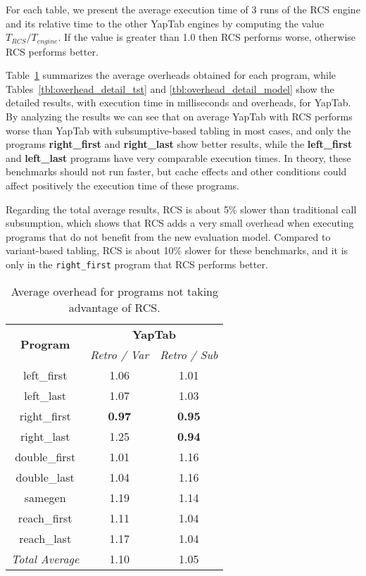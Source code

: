 For each table, we present the average execution time of 3 runs of the RCS engine and its relative time
to the other YapTab engines by computing the value $T_{RCS} / T_{engine}$.
If the value is greater than 1.0 then RCS performs worse, otherwise RCS performs better.

Table~\ref{tbl:overhead_overview} summarizes the average overheads obtained for each program,
while Tables~\ref{tbl:overhead_detail_tst} and \ref{tbl:overhead_detail_model} show the detailed
results, with execution time in milliseconds and overheads, for YapTab.
By analyzing the results we can see that on average YapTab with RCS performs worse
than YapTab with subsumptive-based tabling in most cases, and only the
programs \textbf{right\_first} and \textbf{right\_last} show better results,
while the \textbf{left\_first} and \textbf{left\_last} programs have very comparable execution times.
In theory, these benchmarks should not run faster, but cache effects and other
conditions could affect positively the execution time of these programs.

Regarding the total average results, RCS is about 5\% slower than traditional call subsumption,
which shows that RCS adds a very small overhead when executing programs that do not benefit from the
new evaluation model. Compared to variant-based tabling, RCS is about 10\% slower for these benchmarks,
and it is only in the \texttt{right\_first} program that RCS performs better.

\begin{table}[ht]
\centering
  \begin{tabular}{ccc}
   \hline
    \hline
    \multirow{2}{*}{\textbf{Program}} & \multicolumn{2}{c}{\textbf{YapTab}} \\
    & \textit{\small{Retro / Var}} & \textit{\small{Retro / Sub}} \\
   \hline
   \hline
   left\_first & 1.06 & 1.01 \\
   left\_last &  1.07  & 1.03 \\
   right\_first & \textbf{0.97} & \textbf{0.95} \\
   right\_last & 1.25 & \textbf{0.94} \\
   double\_first & 1.01 & 1.16 \\
   double\_last & 1.04 & 1.16 \\
   samegen & 1.19 & 1.14 \\
   reach\_first  &  1.11  & 1.04 \\
   reach\_last  &  1.17  & 1.04 \\
\hline
\hline
\textit{Total Average} &  1.10 &  1.05 \\
\hline
\hline
\end{tabular}
\caption{Average overhead for programs not taking advantage of RCS.}
\label{tbl:overhead_overview}
\end{table}

